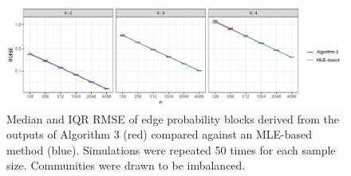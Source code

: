 \documentclass[12pt]{article}
\begin{document}
\begin{figure}[H]

{\centering \includegraphics{summary_files/figure-latex/lambda_est_p_imba-1}

}

\caption{Median and IQR RMSE of edge probability blocks derived from the outputs of Algorithm 3 (red) compared against an MLE-based method (blue). Simulations were repeated 50 times for each sample size. Communities were drawn to be imbalanced.}\label{fig:lambda_est_p_imba}
\end{figure}

\end{document}
